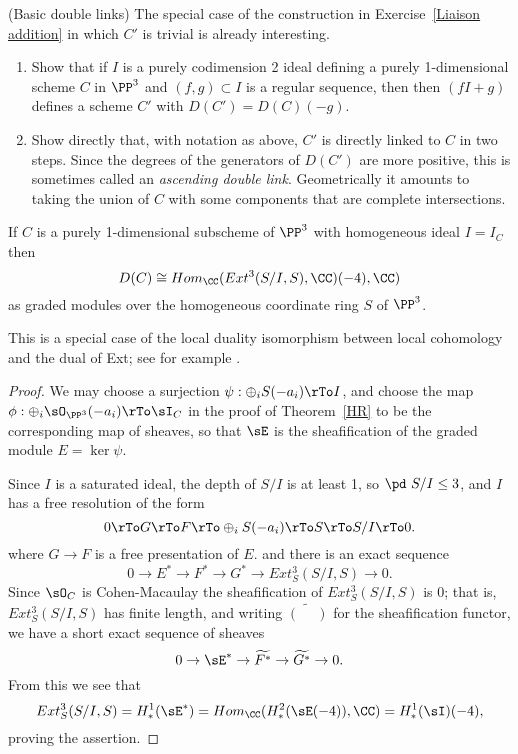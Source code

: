 \begin{exercise}(Basic double links)\label{Basic double links}
The special case of the construction in Exercise~\ref{Liaison addition} in which $C'$ is trivial is already interesting. 

\begin{enumerate}
 \item Show that if $I$ is a purely codimension 2 ideal
 defining a purely 1-dimensional scheme $C$ in $\PP^3$
 and $(f, g)\subset I$ is a regular sequence, then
 then  $(fI+g)$ defines a scheme $C'$ with $D(C') = D(C)(-g)$.

 \item Show directly that, with notation as above, $C'$ is directly linked to $C$
 in two steps. Since the degrees of the generators of $D(C')$ are more positive, this
 is sometimes called an \emph{ascending double link}. Geometrically it amounts to taking the
 union of $C$ with some  components that are complete intersections.
 \end{enumerate}

\end{exercise}


\begin{corollary}
If $C$ is a purely 1-dimensional subscheme of $\PP^3$ with homogeneous ideal $I = I_C$ then 
$$
D(C) \cong Hom_\CC (Ext^3(S/I, S), \CC)(-4), \CC)
$$
as graded modules over the homogeneous coordinate ring $S$ of $\PP^3$.
\end{corollary}

This is a special case of the local duality isomorphism between local cohomology and the dual of Ext; see for example \cite[Theorem A.1.9]{MR2103875}.
\begin{proof}
We may choose a surjection  $\psi:  \oplus_iS(-a_i)\rTo I$, and choose the map
$\phi: \oplus_i\sO_{\PP^3}(-a_i)\rTo\sI_C$
in the proof of Theorem~\ref{HR}
to be the corresponding map of sheaves, so that
$\sE$ is the sheafification of the graded module $E = \ker \psi$.

Since $I$ is a saturated ideal,
 the depth of $S/I$ is at least 1, so $\pd\ S/I\leq 3$, and $I$ has a free resolution of the form
$$
0\rTo G \rTo F \rTo \oplus_iS(-a_i)  \rTo S\rTo S/I \rTo 0.
$$
where $G\to F$ is a free presentation of $E$. and there is an exact sequence
$$
0 \to E^* \to F^* \to G^* \to Ext^3_S(S/I, S) \to 0.
$$
Since $\sO_C$ is Cohen-Macaulay the sheafification of $Ext^3_S(S/I, S)$ is 0; that is,
$Ext^3_S(S/I, S)$ has finite length, and writing $\widetilde{(\phantom{-})}$ for the sheafification functor,
we have a short exact sequence of sheaves 
$$
0\to \sE^* \to \widetilde{F^*} \to \widetilde{G^*}\to 0.
$$
From this we see that 
$$
Ext^3_S(S/I,S) = H^1_*(\sE^*) = Hom_\CC( H^2_*(\sE(-4)),\CC) = H^1_*(\sI)(-4),
$$
proving the assertion.
\end{proof}
